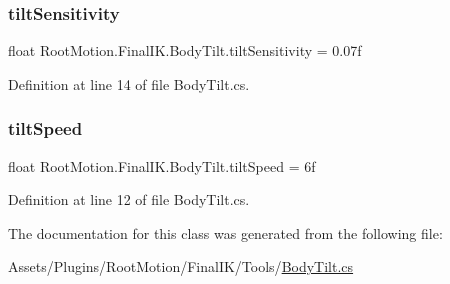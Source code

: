 \subsubsection{\texorpdfstring{tilt\+Sensitivity}{tiltSensitivity}}
{\footnotesize\ttfamily float Root\+Motion.\+Final\+I\+K.\+Body\+Tilt.\+tilt\+Sensitivity = 0.\+07f}



Definition at line 14 of file Body\+Tilt.\+cs.

\mbox{\label{class_root_motion_1_1_final_i_k_1_1_body_tilt_ac9a17a4d8cccc129acc9fb7b57a63bfd}} 
\subsubsection{\texorpdfstring{tilt\+Speed}{tiltSpeed}}
{\footnotesize\ttfamily float Root\+Motion.\+Final\+I\+K.\+Body\+Tilt.\+tilt\+Speed = 6f}



Definition at line 12 of file Body\+Tilt.\+cs.



The documentation for this class was generated from the following file\+:\begin{DoxyCompactItemize}
\item 
Assets/\+Plugins/\+Root\+Motion/\+Final\+I\+K/\+Tools/\mbox{\hyperlink{_body_tilt_8cs}{Body\+Tilt.\+cs}}\end{DoxyCompactItemize}

